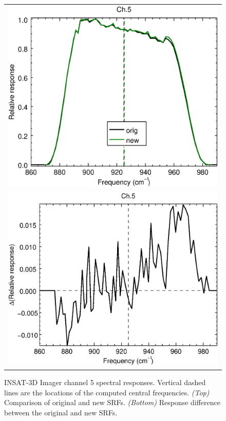 \begin{figure}[H]
  \centering
  \begin{tabular}{c}
    \includegraphics[scale=0.55]{graphics/imgr/srf/imgr_insat3d-5.eps} \\
    \includegraphics[scale=0.55]{graphics/imgr/srf/imgr_insat3d-5.difference.eps}
  \end{tabular}
  \caption{INSAT-3D Imager channel 5 spectral responses. Vertical dashed lines are the locations of the computed central frequencies. \emph{(Top)} Comparison of original and new SRFs. \emph{(Bottom)} Response difference between the original and new SRFs.}
  \label{fig:imgr_ch5}
\end{figure}


